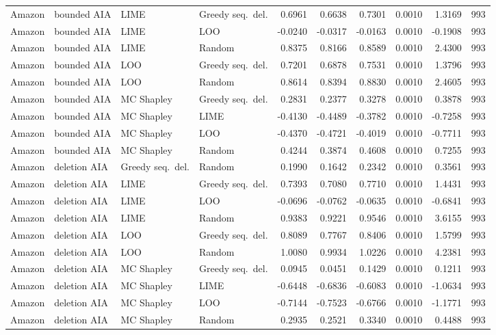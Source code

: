 \begin{longtable}{@{}p{}p{}p{}p{}rrrrrr@{}}
Amazon & bounded AIA & LIME & Greedy seq.\ del. & 0.6961 & 0.6638 & 0.7301 & 0.0010 & 1.3169 & 993 \\
Amazon & bounded AIA & LIME & LOO & -0.0240 & -0.0317 & -0.0163 & 0.0010 & -0.1908 & 993 \\
Amazon & bounded AIA & LIME & Random & 0.8375 & 0.8166 & 0.8589 & 0.0010 & 2.4300 & 993 \\
Amazon & bounded AIA & LOO & Greedy seq.\ del. & 0.7201 & 0.6878 & 0.7531 & 0.0010 & 1.3796 & 993 \\
Amazon & bounded AIA & LOO & Random & 0.8614 & 0.8394 & 0.8830 & 0.0010 & 2.4605 & 993 \\
Amazon & bounded AIA & MC Shapley & Greedy seq.\ del. & 0.2831 & 0.2377 & 0.3278 & 0.0010 & 0.3878 & 993 \\
Amazon & bounded AIA & MC Shapley & LIME & -0.4130 & -0.4489 & -0.3782 & 0.0010 & -0.7258 & 993 \\
Amazon & bounded AIA & MC Shapley & LOO & -0.4370 & -0.4721 & -0.4019 & 0.0010 & -0.7711 & 993 \\
Amazon & bounded AIA & MC Shapley & Random & 0.4244 & 0.3874 & 0.4608 & 0.0010 & 0.7255 & 993 \\
Amazon & deletion AIA & Greedy seq.\ del. & Random & 0.1990 & 0.1642 & 0.2342 & 0.0010 & 0.3561 & 993 \\
Amazon & deletion AIA & LIME & Greedy seq.\ del. & 0.7393 & 0.7080 & 0.7710 & 0.0010 & 1.4431 & 993 \\
Amazon & deletion AIA & LIME & LOO & -0.0696 & -0.0762 & -0.0635 & 0.0010 & -0.6841 & 993 \\
Amazon & deletion AIA & LIME & Random & 0.9383 & 0.9221 & 0.9546 & 0.0010 & 3.6155 & 993 \\
Amazon & deletion AIA & LOO & Greedy seq.\ del. & 0.8089 & 0.7767 & 0.8406 & 0.0010 & 1.5799 & 993 \\
Amazon & deletion AIA & LOO & Random & 1.0080 & 0.9934 & 1.0226 & 0.0010 & 4.2381 & 993 \\
Amazon & deletion AIA & MC Shapley & Greedy seq.\ del. & 0.0945 & 0.0451 & 0.1429 & 0.0010 & 0.1211 & 993 \\
Amazon & deletion AIA & MC Shapley & LIME & -0.6448 & -0.6836 & -0.6083 & 0.0010 & -1.0634 & 993 \\
Amazon & deletion AIA & MC Shapley & LOO & -0.7144 & -0.7523 & -0.6766 & 0.0010 & -1.1771 & 993 \\
Amazon & deletion AIA & MC Shapley & Random & 0.2935 & 0.2521 & 0.3340 & 0.0010 & 0.4488 & 993 \\

\end{longtable}
